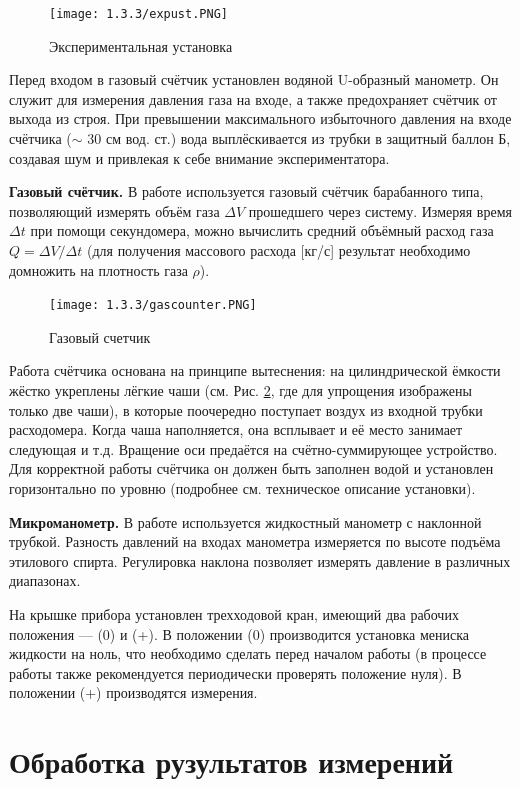 \documentclass[a4paper,12pt]{article} %
\begin{document}
\begin{figure}[H]
    \centering
    \texttt{[image: 1.3.3/expust.PNG]}
    \caption{Экспериментальная установка}
    \label{233}
\end{figure}

Перед входом в газовый счётчик установлен водяной U-образный манометр. Он служит для измерения давления газа на входе, а также предохраняет
счётчик от выхода из строя. При превышении максимального избыточного
давления на входе счётчика ($\sim$ 30 см вод. ст.) вода выплёскивается из трубки
в защитный баллон Б, создавая шум и привлекая к себе внимание экспериментатора.


\textbf{Газовый счётчик.} В работе используется газовый счётчик барабанного
типа, позволяющий измерять объём газа $\Delta V$ прошедшего через систему. Измеряя время $\Delta t$ при помощи секундомера, можно вычислить средний объёмный расход газа $Q = \Delta V/ \Delta t$ (для получения массового расхода [кг/с] результат
необходимо домножить на плотность газа $\rho$).

\begin{figure}[H]
    \centering
    \texttt{[image: 1.3.3/gascounter.PNG]}
    \caption{Газовый счетчик}
    \label{333}
\end{figure}


Работа счётчика основана на принципе вытеснения: на цилиндрической ёмкости жёстко
укреплены лёгкие чаши (см. Рис. \ref{333}, где для
упрощения изображены только две чаши), в которые поочередно поступает воздух из входной
трубки расходомера. Когда чаша наполняется,
она всплывает и её место занимает следующая
и т.д. Вращение оси предаётся на счётно-суммирующее устройство.
Для корректной работы счётчика он должен
быть заполнен водой и установлен горизонтально по уровню (подробнее см. техническое
описание установки).

\textbf{Микроманометр.} В работе используется жидкостный манометр с наклонной трубкой. Разность давлений на входах манометра измеряется по высоте
подъёма этилового спирта. Регулировка
наклона позволяет измерять давление в различных диапазонах.

На крышке прибора установлен трехходовой кран, имеющий два рабочих
положения — (0) и (+). В положении (0) производится установка мениска жидкости на ноль, что необходимо сделать перед началом работы (в процессе работы также рекомендуется периодически проверять положение нуля). В положении (+) производятся измерения.
\newpage


\section{Обработка рузультатов измерений}
\end{document}
